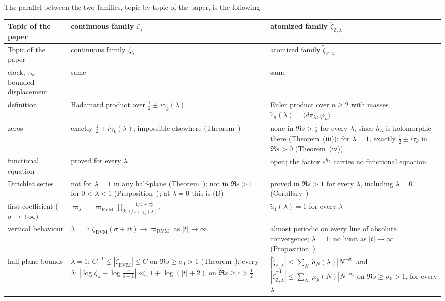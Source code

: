 \documentclass[11pt,reqno]{amsart}
\makeatletter
\let\CG@origref\ref
\let\CG@origeqref\eqref
\newcommand{\CG@gettip}[1]{\@ifundefined{CGTip@#1}{Reference: #1}{\csname CGTip@#1\endcsname}}
\DeclareRobustCommand{\CGref}[1]{\pdftooltip{\CG@origref{#1}}{\CG@gettip{#1}}}
\DeclareRobustCommand{\CGeqref}[1]{\pdftooltip{\CG@origeqref{#1}}{\CG@gettip{#1}}}
\numberwithin{equation}{section}
\theoremstyle{plain}
\theoremstyle{definition}
\theoremstyle{remark}
\newcommand{\Z}{\mathbb Z}
\newcommand{\RVM}{\mathrm{RVM}}
\makeatother
\begin{document}
The parallel between the two families, topic by topic of the paper, is the following.

\begingroup\small
\begin{longtable}{>{\raggedright\arraybackslash}p{}>{\raggedright\arraybackslash}p{}>{\raggedright\arraybackslash}p{}}
\toprule
Topic of the paper & continuous family $\zeta_\lambda$ & atomized family $\tilde\zeta_{\Z,\lambda}$\\
\midrule
\endfirsthead
\toprule
Topic of the paper & continuous family $\zeta_\lambda$ & atomized family $\tilde\zeta_{\Z,\lambda}$\\
\midrule
\endhead
\bottomrule
\endfoot
\addlinespace[2pt]
clock, $\tau_k$, bounded displacement & same & same\\
definition & Hadamard product over $\frac12\pm i\gamma_k(\lambda)$ & Euler product over $n\ge2$ with masses $\tilde c_n(\lambda)=\langle d\pi_\lambda,\varphi_n\rangle$\\
zeros & exactly $\frac12\pm i\gamma_k(\lambda)$; impossible elsewhere (Theorem~\CGref{thm:path}) & none in $\Re s>\frac12$ for every $\lambda$, since $\tilde h_\lambda$ is holomorphic there (Theorem~\CGref{thm:atomized-continuation}(iii)); for $\lambda=1$, exactly $\frac12\pm i\tau_k$ in $\Re s>0$ (Theorem~\CGref{thm:atomized-continuation}(iv))\\
functional equation & proved for every $\lambda$ & open; the factor $e^{\tilde h_\lambda}$ carries no functional equation\\
Dirichlet series & not for $\lambda=1$ in any half-plane (Theorem~\CGref{thm:no-Dirichlet-RVM}); not in $\Re s>1$ for $0<\lambda<1$ (Proposition~\CGref{prop:nonconstant}); at $\lambda=0$ this is (D) & proved in $\Re s>1$ for every $\lambda$, including $\lambda=0$ (Corollary~\CGref{cor:abscissa-one})\\
first coefficient ($\sigma\to+\infty$) & $\varpi_\lambda=\varpi_{\RVM}\prod_k\frac{1/4+\tau_k^2}{1/4+\gamma_k(\lambda)^2}$ \CGeqref{eq:varpi-lambda} & $\tilde a_1(\lambda)=1$ for every $\lambda$\\
vertical behaviour & $\lambda=1$: $\zeta_{\RVM}(\sigma+it)\to\varpi_{\RVM}$ as $|t|\to\infty$ \CGeqref{eq:vertical-limit} & almost periodic on every line of absolute convergence; $\lambda=1$: no limit as $|t|\to\infty$ (Proposition~\CGref{prop:atomized-clock})\\
half-plane bounds & $\lambda=1$: $C^{-1}\le|\zeta_{\RVM}|\le C$ on $\Re s\ge\sigma_0>1$ (Theorem~\CGref{thm:halfplane-RVM}); every $\lambda$: $|\log\zeta_\lambda-\log\frac s{s-1}|\ll_c1+\log(|t|+2)$ on $\Re s\ge c>\frac12$ & $|\tilde\zeta_{\Z,\lambda}|\le\sum_N|\tilde a_N(\lambda)|N^{-\sigma_0}$ and $|\tilde\zeta_{\Z,\lambda}^{-1}|\le\sum_N|\tilde\mu_\lambda(N)|N^{-\sigma_0}$ on $\Re s\ge\sigma_0>1$, for every $\lambda$\\

\end{longtable}
\end{document}
